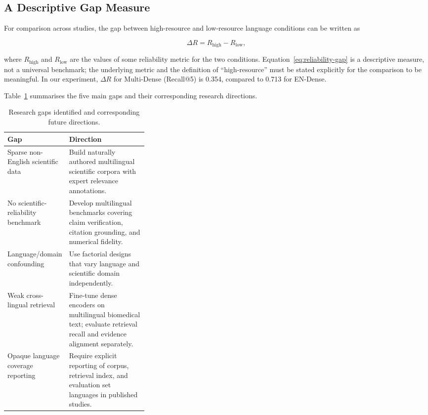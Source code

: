 \documentclass[acmsmall,screen,review]{acmart}
\begin{document}
\subsection{A Descriptive Gap Measure}
\label{sec:gap-measure}

For comparison across studies, the gap between high-resource and
low-resource language conditions can be written as

\begin{equation}
\Delta R = R_{\mathrm{high}} - R_{\mathrm{low}},
\label{eq:reliability-gap}
\end{equation}

where $R_{\mathrm{high}}$ and $R_{\mathrm{low}}$ are the values of some
reliability metric for the two conditions.  Equation~\ref{eq:reliability-gap}
is a descriptive measure, not a universal benchmark; the underlying metric
and the definition of ``high-resource'' must be stated explicitly for the
comparison to be meaningful.  In our experiment, $\Delta R$ for
Multi-Dense (Recall@5) is 0.354, compared to 0.713 for EN-Dense.

Table~\ref{tab:research-gaps} summarises the five main gaps and their
corresponding research directions.

\begin{table}[t]
\centering
\small
\caption{Research gaps identified and corresponding future directions.}
\label{tab:research-gaps}
\begin{tabularx}{\linewidth}{@{}p{0.33\linewidth}X@{}}
\toprule
\textbf{Gap} & \textbf{Direction} \\
\midrule
Sparse non-English scientific data &
Build naturally authored multilingual scientific corpora with expert
relevance annotations. \\
No scientific-reliability benchmark &
Develop multilingual benchmarks covering claim verification, citation
grounding, and numerical fidelity. \\
Language/domain confounding &
Use factorial designs that vary language and scientific domain
independently. \\
Weak cross-lingual retrieval &
Fine-tune dense encoders on multilingual biomedical text; evaluate
retrieval recall and evidence alignment separately. \\
Opaque language coverage reporting &
Require explicit reporting of corpus, retrieval index, and evaluation
set languages in published studies. \\
\bottomrule
\end{tabularx}
\end{table}
\end{document}
